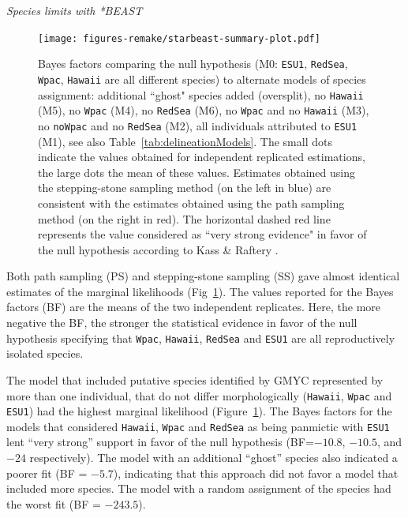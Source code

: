 \documentclass[12pt,letterpaper]{article}\usepackage[]{graphicx}\usepackage[]{color}
\renewcommand{\subsection}[1]{%
\bigskip
\begin{center}
\begin{large}
\normalfont\itshape #1
\end{large}
\end{center}}
\begin{document}
\subsection{Species limits with *BEAST}



\begin{figure}

{\centering \texttt{[image: figures-remake/starbeast-summary-plot.pdf]}

}

\caption{Bayes factors comparing the null hypothesis (M0: \texttt{ESU1},
  \texttt{RedSea}, \texttt{Wpac}, \texttt{Hawaii} are all different species) to
  alternate models of species assignment: additional ``ghost" species added
  (oversplit), no \texttt{Hawaii} (M5), no \texttt{Wpac} (M4), no
  \texttt{RedSea} (M6), no \texttt{Wpac} and no \texttt{Hawaii} (M3), no
  \texttt{noWpac} and no \texttt{RedSea} (M2), all individuals attributed to
  \texttt{ESU1} (M1), see also Table~\ref{tab:delineationModels}. The small dots
  indicate the values obtained for independent replicated estimations, the large
  dots the mean of these values. Estimates obtained using the stepping-stone
  sampling method (on the left in blue) are consistent with the estimates
  obtained using the path sampling method (on the right in red). The horizontal
  dashed red line represents the value considered as ``very strong evidence" in
  favor of the null hypothesis according to Kass \& Raftery
  \citep{Kass1995}.}\label{fig:starbeast-summary}
\end{figure}

Both path sampling (PS) and stepping-stone sampling (SS) gave almost identical
estimates of the marginal likelihoods (Fig~\ref{fig:starbeast-summary}). The
values reported for the Bayes factors (BF) are the means of the two independent
replicates. Here, the more negative the BF, the stronger the statistical
evidence in favor of the null hypothesis specifying that \texttt{Wpac},
\texttt{Hawaii}, \texttt{RedSea} and \texttt{ESU1} are all reproductively
isolated species.

The model that included putative species identified by GMYC represented by more
than one individual, that do not differ morphologically (\texttt{Hawaii},
\texttt{Wpac} and \texttt{ESU1}) had the highest marginal likelihood
(Figure~\ref{fig:starbeast-summary}). The Bayes factors for the models that
considered \texttt{Hawaii}, \texttt{Wpac} and \texttt{RedSea} as being panmictic
with \texttt{ESU1} lent ``very strong'' support in favor of the null hypothesis
(BF=\ensuremath{-10.8}, \ensuremath{-10.5}, and \ensuremath{-24} respectively). The
model with an additional ``ghost'' species also indicated a poorer fit (BF =
\ensuremath{-5.7}), indicating that this approach did not favor a model that
included more species. The model with a random assignment of the species had the
worst fit (BF = \ensuremath{-243.5}).
\end{document}
